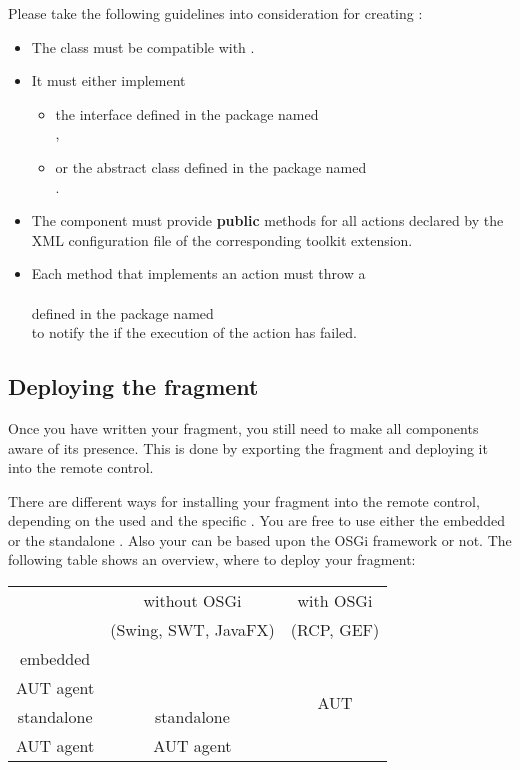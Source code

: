 Please take the following guidelines into consideration for creating
\gdtesterclasses:
\begin{itemize}
  \item The class must be compatible with .
  \item It must either implement
  \begin{itemize}
    \item the interface  defined in the package named\\
        ,\\
	 \item or the abstract class 
	     defined in the package named\\
	     .
  \end{itemize}
  \item The component must provide \textbf{public} methods for all actions
        declared by the XML configuration file of the corresponding \ite{}
        toolkit extension.
  \item Each method that implements an action must throw a\\
        \\
        defined in the package named\\
        to notify the \ite{} if the execution of the action has  failed.
\end{itemize}

\subsection{Deploying the fragment}

Once you have written your fragment, you still need to make all components
aware of its presence. This is done by exporting the fragment and
deploying it into the remote control.

There are different ways for installing your fragment into the remote
control, depending on the  \gdagent{} used and the specific \gdaut{}. You are free to
use either the embedded \gdagent{} or the standalone \gdagent{}. Also your \gdaut{}
can be based upon the OSGi framework or not. The following table shows an
overview, where to deploy your fragment:

\begin{center}
\begin{tabular}{|c||c|c|}
\hline
~ & without OSGi & with OSGi\\
~ & (Swing, SWT, JavaFX) & (RCP, GEF)\\
\hline\hline
embedded & \multirow{2}{*}{\ite{}} & \multirow{4}{*}{AUT}\\
AUT agent & & \\
\hhline{--~}
standalone & standalone & \\
AUT agent  & AUT agent  & \\
\hline
\end{tabular}
\end{center}

